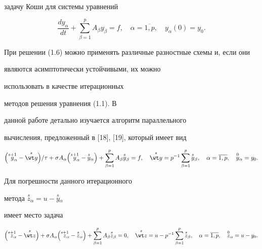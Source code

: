 задачу Коши для системы уравнений


\begin{equation}


\frac{d{y_\alpha}}{dt}+\sum\limits_{\beta=1}^p A_\beta y_\beta =f,\quad


\alpha=\overline {1,p},\quad y_\alpha(0)=y_0.


\end{equation}


При решении (1.6) можно применять различные разностные схемы и, если они


являются асимптотически устойчивыми, их можно 


использовать в качестве итерационных


методов решения уравнения (1.1). В 


данной работе детально изучается алгоритм параллельного


вычисления, предложенный в [18], [19], который имеет вид


\begin{equation}


\Big(\overset{s+1}{y}_{\!\!\!\alpha}-\overset{s}{\wt y}{}\Big)/\tau+


\sigma A_\alpha\Big(\overset{s+1}{y}_{\!\!\!\alpha}


-\overset{s}{y}{}_\alpha\Big)+


\sum\limits_{\beta=1}^p A_\beta \overset{s}{y}{}_\beta=f,\quad


\overset{s}{\wt y}{}=


p^{-1}\sum\limits_{\beta=1}^p \overset{s}{y}{}_\beta,\quad


\alpha=\overline {1,p},\quad\overset{0}{y}{}_\alpha=y_0.


\end{equation}


Для погрешности данного итерационного 


метода $\overset{s}{z}{}_\alpha=u-\overset{s}{y}{}_\alpha$


имеет место задача 


\begin{equation} 


\Big(\overset{s+1}{z}{}_{\!\!\!\alpha}-\overset{s}{\wt z}{}\Big)+ 


\sigma A_\alpha\Big(\overset{s+1}{z}{}_{\!\!\!\alpha}


-\overset{s}{z}{}_\alpha\Big)+


\sum\limits_{\beta=1}^p A_\beta \overset{s}{z}{}_\beta=0,\quad


\overset{s}{\wt z}{}=


u-p^{-1}\sum\limits_{\beta=1}^p \overset{s}{z}{}_\beta,\quad


\alpha=\overline {1,p},\quad\overset{0}{z}{}_\alpha=u-y_0.


\end{equation}


